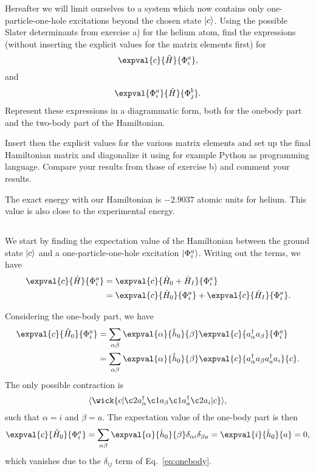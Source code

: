Hereafter we will limit ourselves to a system which now contains only one-particle-one-hole excitations beyond the chosen state $\lvert c\rangle$.
Using the possible Slater determinants from exercise a) for the helium atom, find the expressions (without inserting the explicit values for the matrix elements first) for %
\begin{equation*}
    \expval{c}{\hat{H}}{\Phi_i^a},
\end{equation*}
and
\begin{equation*}
    \expval{\Phi_i^a}{\hat{H}}{\Phi_j^b}.
\end{equation*}
Represent these expressions in a diagrammatic form, both for the onebody part and the two-body part of the Hamiltonian.

Insert then the explicit values for the various matrix elements and set up the final Hamiltonian matrix and diagonalize it using for example Python as programming language.
Compare your results from those of exercise b) and comment your results. %

The exact energy with our Hamiltonian is $-2.9037$ atomic units for helium.
This value is also close to the experimental energy.

\subsection{}
We start by finding the expectation value of the Hamiltonian between the ground state $\lvert c\rangle$ and a one-particle-one-hole excitation $\lvert\Phi_i^a\rangle$.
Writing out the terms, we have
\begin{align*}
    \expval{c}{\hat{H}}{\Phi_i^a} &= \expval{c}{\hat{H}_0 + \hat{H}_I}{\Phi_i^a} \\
    &= \expval{c}{\hat{H}_0}{\Phi_i^a} + \expval{c}{\hat{H}_I}{\Phi_i^a}. \\
\end{align*}

Considering the one-body part, we have
\begin{align*}
    \expval{c}{\hat{H}_0}{\Phi_i^a} &= \sum_{\alpha\beta} \expval{\alpha}{\hat{h}_0}{\beta} \expval{c}{a_\alpha^\dagger a_\beta}{\Phi_i^a} \\
    &= \sum_{\alpha\beta} \expval{\alpha}{\hat{h}_0}{\beta} \expval{c}{a_\alpha^\dagger a_\beta a_a^\dagger a_i}{c}. \\
\end{align*}
The only possible contraction is
\begin{equation*}
    \langle
    \wick{
        c
        \vert
        \c2 a_\alpha^\dagger \c1 a_\beta \c1 a_a^\dagger \c2 a_i
        \vert
        c
    }
    \rangle,
\end{equation*}
such that $\alpha = i$ and $\beta = a$.
The expectation value of the one-body part is then
\begin{equation*}
    \expval{c}{\hat{H}_0}{\Phi_i^a} = \sum_{\alpha \beta} \expval{\alpha}{\hat{h}_0}{\beta} \delta_{\alpha i} \delta_{\beta a} = \expval{i}{\hat{h}_0}{a} = 0,
\end{equation*}
which vanishes due to the $\delta_{ij}$ term of Eq.~\eqref{eq:onebody}.

